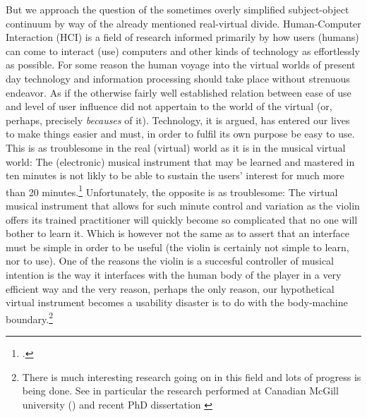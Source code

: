 But we approach the question of the sometimes overly simplified subject-object continuum by way of the already mentioned real-virtual divide. Human-Computer Interaction (HCI) is a field of research informed primarily by how users (humans) can come to interact (use) computers and other kinds of technology as effortlessly as possible. For some reason the human voyage into the virtual worlds of present day technology and information processing should take place without strenuous endeavor. As if the otherwise fairly well established relation between ease of use and level of user influence did not appertain to the world of the virtual (or, perhaps, precisely \emph{becauses} of it). Technology, it is argued, has entered our lives to make things easier and must, in order to fulfil its own purpose be easy to use. This is as troublesome in the real (virtual) world as it is in the musical virtual world: The (electronic) musical instrument that may be learned and mastered in ten minutes is not likly to be able to sustain the users' interest for much more than 20 minutes.\footcite[An example of an instrument that does not obey this rule is the CrackleBox. See][]{waisvisz75} Unfortunately, the opposite is as troublesome: The virtual musical instrument that allows for such minute control and variation as the violin offers its trained practitioner will quickly become so complicated that no one will bother to learn it. Which is however not the same as to assert that an interface must be simple in order to be useful (the violin is certainly not simple to learn, nor to use). One of the reasons the violin is a succesful controller of musical intention is the way it interfaces with the human body of the player in a very efficient way and the very reason, perhaps the only reason, our hypothetical virtual instrument becomes a usability disaster is to do with the body-machine boundary.\footnote{There is much interesting research going on in this field and lots of progress is being done. See in particular the research performed at Canadian McGill university (\cite{wanderley09,wanderley00}) and recent PhD dissertation \cite{jensenius08}}

